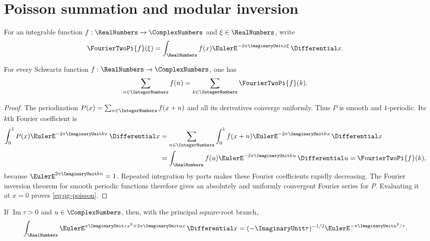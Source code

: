 \section{Poisson summation and modular inversion}

\begin{definition}
\label{qg:def-fourier-transform}
For an integrable function $f:\RealNumbers\to\ComplexNumbers$ and
$\xi\in\RealNumbers$, write
\[
 \FourierTwoPi{f}(\xi)
 =\int_{\RealNumbers}f(x)\EulerE^{-2\pi\ImaginaryUnit x\xi}
   \,\Differential x.
\]
\end{definition}

\begin{theorem}
\label{qg:thm-poisson}
For every Schwartz function $f:\RealNumbers\to\ComplexNumbers$, one has
\begin{equation}
 \sum_{n\in\IntegerNumbers}f(n)
 =\sum_{k\in\IntegerNumbers}\FourierTwoPi{f}(k).
\label{eq:qg-poisson}
\end{equation}
\end{theorem}

\begin{proof}
The periodization $P(x)=\sum_{n\in\IntegerNumbers}f(x+n)$ and all its
derivatives converge uniformly.  Thus $P$ is smooth and $1$-periodic.  Its
$k$th Fourier coefficient is
\begin{align*}
 \int_0^1P(x)\EulerE^{-2\pi\ImaginaryUnit kx}\,\Differential x
 &=\sum_{n\in\IntegerNumbers}\int_0^1
   f(x+n)\EulerE^{-2\pi\ImaginaryUnit kx}\,\Differential x\\
 &=\int_{\RealNumbers}f(u)\EulerE^{-2\pi\ImaginaryUnit ku}
   \,\Differential u
 =\FourierTwoPi{f}(k),
\end{align*}
because $\EulerE^{2\pi\ImaginaryUnit kn}=1$.  Repeated integration by
parts makes these Fourier coefficients rapidly decreasing.  The Fourier
inversion theorem for smooth periodic functions therefore gives an absolutely
and uniformly convergent Fourier series for $P$.  Evaluating it at $x=0$ proves
\eqref{eq:qg-poisson}.
\end{proof}

\begin{lemma}
\label{qg:lem-gaussian-fourier}
If $\operatorname{Im}\tau>0$ and $u\in\ComplexNumbers$, then, with the
principal square-root branch,
\begin{equation}
 \int_{\RealNumbers}
 \EulerE^{\pi\ImaginaryUnit\tau x^2+2\pi\ImaginaryUnit ux}
 \,\Differential x
 =(-\ImaginaryUnit\tau)^{-1/2}
  \EulerE^{-\pi\ImaginaryUnit u^2/\tau}.
\label{eq:qg-complex-gaussian}
\end{equation}
\end{lemma}


